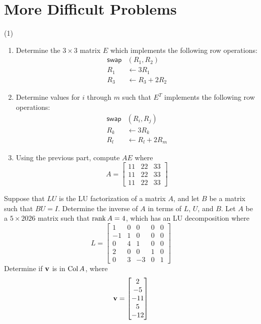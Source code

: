 \section{More Difficult Problems}

\begin{tasks}[resume, style=enumerate](1)
\task
  \begin{enumerate}[label=(\alph*)]
  \item
    Determine the $3 \times 3$ matrix $E$ which implements the
    following row operations:
    \begin{align*}
      \mathsf{swap}&(R_1, R_2) \\
      R_1 &\gets 3R_1 \\
      R_3 &\gets R_3 + 2 R_2
    \end{align*}
  \item
    Determine values for $i$ through $m$ such that $E^T$ implements
    the following row operations:
    \begin{align*}
      \mathsf{swap}&(R_i, R_j) \\
      R_k &\gets 3R_k \\
      R_l &\gets R_l + 2 R_m
    \end{align*}
  \item
    Using the previous part, compute $AE$ where
    \begin{displaymath}
      A =
      \begin{bmatrix}
        11 & 22 & 33 \\
        11 & 22 & 33 \\
        11 & 22 & 33
      \end{bmatrix}
    \end{displaymath}
  \end{enumerate}
\task
  Suppose that $LU$ is the LU factorization of a matrix $A$, and let
  $B$ be a matrix such that $BU = I$.  Determine the inverse of $A$ in
  terms of $L$, $U$, and $B$.
\task
  Let $A$ be a $5 \times 2026$ matrix such that $\operatorname{\mathrm{rank}} A = 4$, which
  has an LU decomposition where
  \begin{displaymath}
    L =
    \begin{bmatrix}
      1 & 0 & 0 & 0 & 0 \\
      -1 & 1 & 0 & 0 & 0\\
      0 & 4 & 1 & 0 & 0\\
      2 & 0 & 0 & 1 & 0 \\
      0 & 3 & -3 & 0 & 1
    \end{bmatrix}
  \end{displaymath}
  Determine if $\mathbf v$ is in $\operatorname{\mathrm{Col}} A$, where
  \begin{displaymath}
    \mathbf v =  \begin{bmatrix} 2 \\ -5 \\ -11 \\ 5 \\ -12 \end{bmatrix} 
  \end{displaymath}
\end{tasks}
